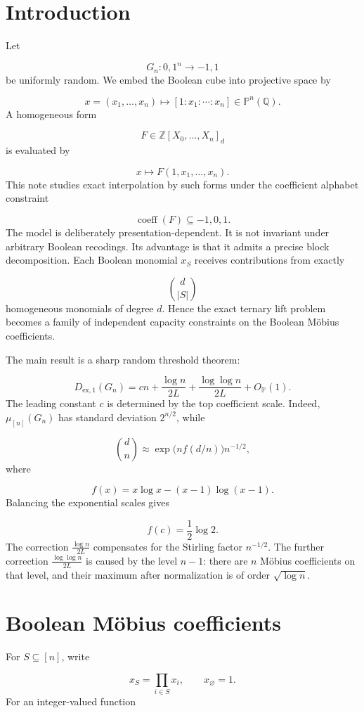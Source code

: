 \documentclass[11pt]{article}
\theoremstyle{definition}
\begin{document}
\section{Introduction}
Let

\[
G_n:{0,1}^n\to{-1,1}
\]
be uniformly random. We embed the Boolean cube into projective space by

\[
x=(x_1,\dots,x_n)\mapsto [1:x_1:\cdots:x_n]\in\mathbb{P}^n(\mathbb{Q}).
\]
A homogeneous form

\[
F\in\mathbb{Z}[X_0,\dots,X_n]_d
\]
is evaluated by

\[
x\mapsto F(1,x_1,\dots,x_n).
\]
This note studies exact interpolation by such forms under the coefficient alphabet constraint

\[
\operatorname{coeff}(F)\subseteq{-1,0,1}.
\]
The model is deliberately presentation-dependent. It is not invariant under arbitrary Boolean recodings. Its advantage is that it admits a precise block decomposition. Each Boolean monomial $x_S$ receives contributions from exactly

\[
\binom d{|S|}
\]
homogeneous monomials of degree $d$. Hence the exact ternary lift problem becomes a family of independent capacity constraints on the Boolean Möbius coefficients.

The main result is a sharp random threshold theorem:

\[
D_{\mathrm{ex},1}(G_n)
=
cn+
\frac{\log n}{2L}
+
\frac{\log\log n}{2L}
+
O_{\mathbb{P}}(1).
\]
The leading constant $c$ is determined by the top coefficient scale. Indeed, $\mu_{[n]}(G_n)$ has standard deviation $2^{n/2}$, while

\[
\binom dn
\approx
\exp\bigl(n f(d/n)\bigr)n^{-1/2},
\]
where

\[
f(x)=x\log x-(x-1)\log(x-1).
\]
Balancing the exponential scales gives

\[
f(c)=\frac12\log2.
\]
The correction $\frac{\log n}{2L}$ compensates for the Stirling factor $n^{-1/2}$. The further correction $\frac{\log\log n}{2L}$ is caused by the level $n-1$: there are $n$ Möbius coefficients on that level, and their maximum after normalization is of order $\sqrt{\log n}$.

\section{Boolean Möbius coefficients}
For $S\subseteq[n]$, write

\[
x_S=\prod_{i\in S}x_i,
\qquad x_\varnothing=1.
\]
For an integer-valued function
\end{document}
